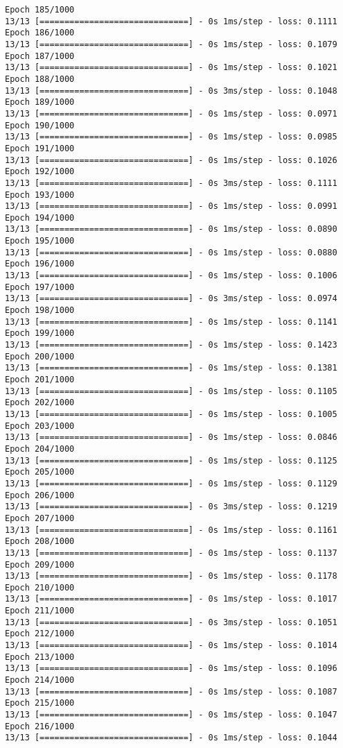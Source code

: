 \documentclass[11pt]{article}
\begin{document}
\begin{Verbatim}[commandchars=\\\{\}]
Epoch 185/1000
13/13 [==============================] - 0s 1ms/step - loss: 0.1111
Epoch 186/1000
13/13 [==============================] - 0s 1ms/step - loss: 0.1079
Epoch 187/1000
13/13 [==============================] - 0s 1ms/step - loss: 0.1021
Epoch 188/1000
13/13 [==============================] - 0s 3ms/step - loss: 0.1048
Epoch 189/1000
13/13 [==============================] - 0s 1ms/step - loss: 0.0971
Epoch 190/1000
13/13 [==============================] - 0s 1ms/step - loss: 0.0985
Epoch 191/1000
13/13 [==============================] - 0s 1ms/step - loss: 0.1026
Epoch 192/1000
13/13 [==============================] - 0s 3ms/step - loss: 0.1111
Epoch 193/1000
13/13 [==============================] - 0s 1ms/step - loss: 0.0991
Epoch 194/1000
13/13 [==============================] - 0s 1ms/step - loss: 0.0890
Epoch 195/1000
13/13 [==============================] - 0s 1ms/step - loss: 0.0880
Epoch 196/1000
13/13 [==============================] - 0s 1ms/step - loss: 0.1006
Epoch 197/1000
13/13 [==============================] - 0s 3ms/step - loss: 0.0974
Epoch 198/1000
13/13 [==============================] - 0s 1ms/step - loss: 0.1141
Epoch 199/1000
13/13 [==============================] - 0s 1ms/step - loss: 0.1423
Epoch 200/1000
13/13 [==============================] - 0s 1ms/step - loss: 0.1381
Epoch 201/1000
13/13 [==============================] - 0s 1ms/step - loss: 0.1105
Epoch 202/1000
13/13 [==============================] - 0s 1ms/step - loss: 0.1005
Epoch 203/1000
13/13 [==============================] - 0s 1ms/step - loss: 0.0846
Epoch 204/1000
13/13 [==============================] - 0s 1ms/step - loss: 0.1125
Epoch 205/1000
13/13 [==============================] - 0s 1ms/step - loss: 0.1129
Epoch 206/1000
13/13 [==============================] - 0s 3ms/step - loss: 0.1219
Epoch 207/1000
13/13 [==============================] - 0s 1ms/step - loss: 0.1161
Epoch 208/1000
13/13 [==============================] - 0s 1ms/step - loss: 0.1137
Epoch 209/1000
13/13 [==============================] - 0s 1ms/step - loss: 0.1178
Epoch 210/1000
13/13 [==============================] - 0s 1ms/step - loss: 0.1017
Epoch 211/1000
13/13 [==============================] - 0s 3ms/step - loss: 0.1051
Epoch 212/1000
13/13 [==============================] - 0s 1ms/step - loss: 0.1014
Epoch 213/1000
13/13 [==============================] - 0s 1ms/step - loss: 0.1096
Epoch 214/1000
13/13 [==============================] - 0s 1ms/step - loss: 0.1087
Epoch 215/1000
13/13 [==============================] - 0s 1ms/step - loss: 0.1047
Epoch 216/1000
13/13 [==============================] - 0s 1ms/step - loss: 0.1044

\end{Verbatim}
\end{document}
